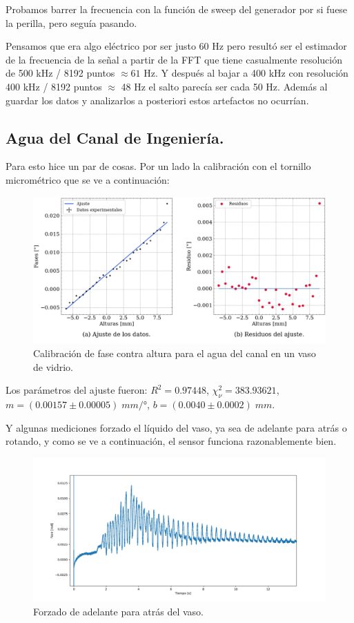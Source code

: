 Probamos barrer la frecuencia con la función de sweep del generador por si fuese la perilla, pero seguía pasando. 

Pensamos que era algo eléctrico por ser justo 60 Hz pero resultó ser el estimador de la frecuencia de la señal a partir de la FFT que tiene casualmente resolución de 500 kHz / 8192 puntos $\approx61$ Hz. Y después al bajar a 400 kHz con resolución 400 kHz / 8192 puntos $\approx$ 48 Hz el salto parecía ser cada 50 Hz. Además al guardar los datos y analizarlos a posteriori estos artefactos no ocurrían.

\subsection*{Agua del Canal de Ingeniería.}
Para esto hice un par de cosas. Por un lado la calibración con el tornillo micrométrico que se ve a continuación:


\begin{figure}[th!]
	\centering
	\includegraphics[width=0.87\linewidth]{Figures/23_06_2025/Ajuste_canal}
	\caption{Calibración de fase contra altura para el agua del canal en un vaso de vidrio.}
	\label{fig:ajustecanal}
\end{figure}

Los parámetros del ajuste fueron: $R^2=0.97448$,	$\chi_\nu^2=383.93621$,	$m = (0.00157 \pm 0.00005)\; mm/°$,	$b = (0.0040 \pm 0.0002)\; mm$.

Y algunas mediciones forzado el líquido del vaso, ya sea de adelante para atrás o rotando, y como se ve a continuación, el sensor funciona razonablemente bien.


\begin{figure}[th!]
	\centering
	\includegraphics[width=0.78\linewidth]{Figures/23_06_2025/Forzado_VASO_CANAL}
	\caption{Forzado de adelante para atrás del vaso. }
	\label{fig:forzadovasocanal}
\end{figure}

